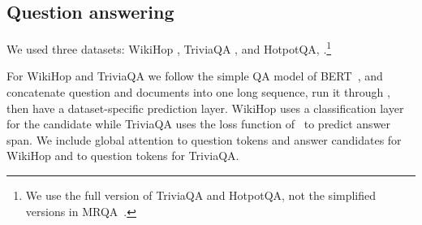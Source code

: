 \subsection{Question answering}
We used three datasets: WikiHop \cite{Welbl2018ConstructingDF-Wikihop}, TriviaQA \cite[][Wikipedia setting]{Joshi2017TriviaQAAL}, and HotpotQA, \cite[][distractor setting]{Yang2018-HotpotQAAD}.\footnote{We use the full version of TriviaQA and HotpotQA, not the simplified versions in MRQA~\cite{mrqa}.} 


For WikiHop and TriviaQA we follow the simple QA model of BERT~\cite{bert}, and concatenate question and documents into one long sequence, run it through \model, then have a dataset-specific prediction layer. WikiHop uses a classification layer for the candidate while TriviaQA uses the loss function of~\citet{Clark2017SimpleAE} to predict answer span.  We include global attention to question tokens and answer candidates for WikiHop and to question tokens for TriviaQA.

